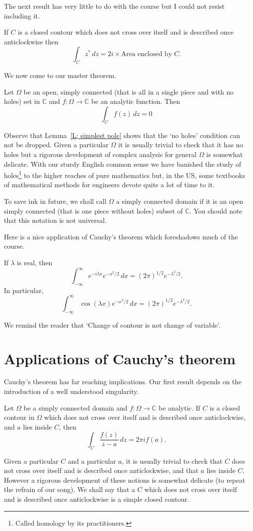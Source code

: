 The next result has very little to do with the course
but I could not resist including it.
\begin{lemma}
If $C$ is a closed contour which does not cross over itself
and is described once anticlockwise  then
\[\int_{C}z^{*}\,dz=2i\times\text{Area enclosed by $C$}.\]
\end{lemma}

We now come to our master theorem.
\begin{theorem} Let $\Omega$ be an
open, simply connected (that is all in a single piece 
and with no holes) set in ${\mathbb C}$ and
$f:\Omega\rightarrow{\mathbb C}$ be an analytic function.
Then
\[\int_{C}f(z)\,dz=0\]
\end{theorem}
 Observe that Lemma~\ref{L; simplest pole}
shows that the `no holes' condition can not be dropped.
Given a particular $\Omega$ it is usually trivial to check
that it has no holes but a rigorous development 
of complex analysis for general $\Omega$ is somewhat delicate.
With our sturdy English common sense we have banished
the study of holes\footnote{Called homology by its
practitioners.} to the higher reaches of pure mathematics
but, in the US, some textbooks of mathematical methods for
engineers devote quite a lot of time to it.

To save ink in future, we shall call $\Omega$ a simply connected
domain if it is
an open simply connected (that is one piece without holes)
subset of ${\mathbb C}$. You should note that this notation is
not universal.

Here is a nice application of Cauchy's theorem which
foreshadows much of the course.
\begin{lemma} If $\lambda$ is real, then
\[\int_{-\infty}^{\infty}e^{-i\lambda x}e^{-x^{2}/2}\,dx
=(2\pi)^{1/2}e^{-\lambda^{2}/2}.\]
In particular,
\[\int_{-\infty}^{\infty}\cos(\lambda x)e^{-x^{2}/2}\,dx
=(2\pi)^{1/2}e^{-\lambda^{2}/2}.\]
\end{lemma}
We remind the reader that
`Change of contour is not change of variable'.
\section{Applications of Cauchy's theorem} 
Cauchy's theorem has far reaching implications.
Our first result depends on the introduction of
a well understood singularity.
\begin{theorem}%
Let $\Omega$
be a simply connected domain and $f:\Omega\rightarrow{\mathbb C}$
be analytic. If $C$ is a closed contour in $\Omega$
which does not cross over itself
and is described once anticlockwise,
and $a$ lies inside $C$,
then
\[\int_{C}\frac{f(z)}{z-a}\,dz=2\pi if(a).\]
\end{theorem}
Given a particular $C$ and a particular $a$,
it is usually trivial to check that $C$
does not cross over itself
and is described once anticlockwise, and 
that $a$ lies inside $C$.
However a rigorous development 
of these notions is somewhat delicate (to repeat
the refrain of our song). We shall say that a $C$
which does not cross over itself
and is described once anticlockwise
is a simple closed contour.

